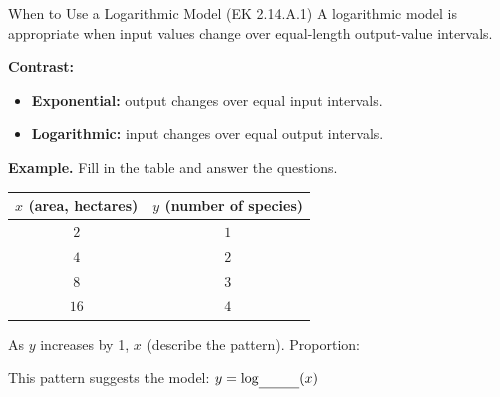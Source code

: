 \documentclass[10pt]{article}
\begin{document}
\begin{notesbox}{When to Use a Logarithmic Model (EK 2.14.A.1)}
A logarithmic model is appropriate when input values change \blank{3cm} over
equal-length output-value intervals.

\vspace{6pt}
\textbf{Contrast:}
\begin{itemize}[leftmargin=1.5em,itemsep=4pt,topsep=2pt]
  \item \textbf{Exponential:} output changes \blank{3cm} over equal input intervals.
  \item \textbf{Logarithmic:} input changes \blank{3cm} over equal output intervals.
\end{itemize}

\vspace{8pt}
\textbf{Example.} Fill in the table and answer the questions.

\vspace{4pt}
\begin{center}
\renewcommand{\arraystretch}{1.8}
\begin{tabular}{|c|c|}
\hline
\rowcolor{sky}
$x$ (area, hectares) & $y$ (number of species) \\
\hline
$2$  & $1$ \\
\hline
$4$  & $2$ \\
\hline
$8$  & $3$ \\
\hline
$16$ & $4$ \\
\hline
\end{tabular}
\end{center}

\vspace{6pt}
As $y$ increases by 1, $x$ \blank{4cm} (describe the pattern). \quad Proportion: \blank{1.5cm}

\vspace{4pt}
This pattern suggests the model: $y = \log_{\blank{1cm}}(x)$
\end{notesbox}

\vspace{0.08in}
\end{document}
